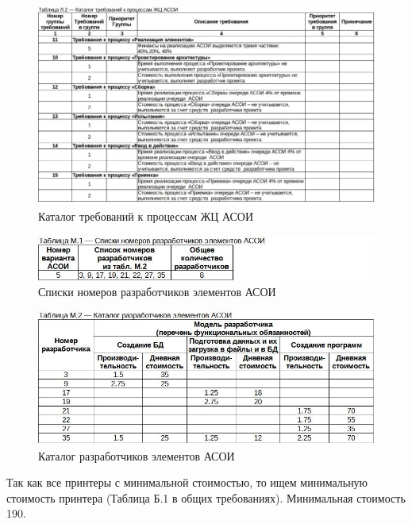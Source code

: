 \documentclass[12pt, a4paper, simple]{eskdtext}
\begin{document}
    \begin{figure}[ph!]
        \centering
        \includegraphics[width=16cm]
            {_docs/ТаблицаЛ2КаталогТребованийКПроцессамЖЦАСОИ.jpg}
        \caption{Каталог требований к процессам ЖЦ АСОИ}
    \end{figure}

    \begin{figure}[ph!]
        \centering
        \includegraphics[]
            {_docs/ТаблицаМ1СпискиНомеровРазработчиковЭлементовАСОИ.jpg}
        \caption{Списки номеров разработчиков элементов АСОИ}
    \end{figure}

    \begin{figure}[ph!]
        \centering
        \includegraphics[width=16cm]
            {_docs/ТаблицаМ2КаталогРазработчиковЭлементовАСОИ.jpg}
        \caption{Каталог разработчиков элементов АСОИ}
    \end{figure}

    \newpage

    Так как все принтеры с минимальной стоимостью, то ищем минимальную стоимость принтера (Таблица Б.1 в общих требованиях).
    Минимальная стоимость 190.
\end{document}
